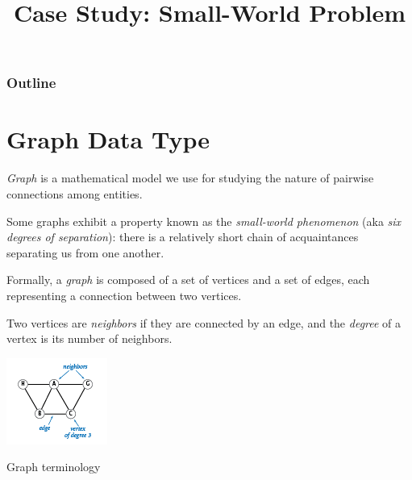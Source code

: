 \documentclass[8pt,a4paper,compress,handout]{beamer}
\title{Case Study: Small-World Problem}
\date{}
\begin{document}
\begin{frame}
\vfill
\titlepage
\end{frame}

\begin{frame}
\frametitle{Outline}
\tableofcontents
\end{frame}

\section{Graph Data Type}
\begin{frame}[fragile]
\emph{Graph} is a mathematical model we use for studying the nature of pairwise connections among entities.

\bigskip

Some graphs exhibit a property known as the \emph{small-world phenomenon} (aka \emph{six degrees of separation}): there is a relatively short chain of acquaintances separating us from one another.

\bigskip

Formally, a \emph{graph} is composed of a set of vertices and a set of edges, each representing a connection between two vertices. 

\bigskip

Two vertices are \emph{neighbors} if they are connected by an edge, and the \emph{degree} of a vertex is its number of neighbors.

\begin{center}
\includegraphics[scale=0.5]{figures/graph.png}

\smallskip

\tiny Graph terminology
\end{center}
\end{frame}
\end{document}
